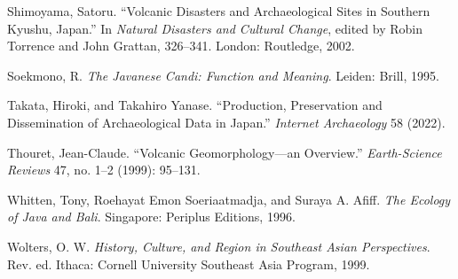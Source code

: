 \documentclass[12pt,a4paper]{article}
\begin{document}
\vspace{0.5em}
\noindent Shimoyama, Satoru. ``Volcanic Disasters and Archaeological Sites in Southern Kyushu, Japan.'' In \emph{Natural Disasters and Cultural Change}, edited by Robin Torrence and John Grattan, 326--341. London: Routledge, 2002.

\vspace{0.5em}
\noindent Soekmono, R. \emph{The Javanese Candi: Function and Meaning}. Leiden: Brill, 1995.

\vspace{0.5em}
\noindent Takata, Hiroki, and Takahiro Yanase. ``Production, Preservation and Dissemination of Archaeological Data in Japan.'' \emph{Internet Archaeology} 58 (2022).

\vspace{0.5em}
\noindent Thouret, Jean-Claude. ``Volcanic Geomorphology---an Overview.'' \emph{Earth-Science Reviews} 47, no. 1--2 (1999): 95--131.

\vspace{0.5em}
\noindent Whitten, Tony, Roehayat Emon Soeriaatmadja, and Suraya A. Afiff. \emph{The Ecology of Java and Bali}. Singapore: Periplus Editions, 1996.

\vspace{0.5em}
\noindent Wolters, O. W. \emph{History, Culture, and Region in Southeast Asian Perspectives}. Rev. ed. Ithaca: Cornell University Southeast Asia Program, 1999.
\end{document}
